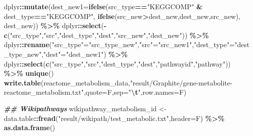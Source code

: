 \documentclass[
]{book}
\newenvironment{Shaded}{\begin{snugshade}}{\end{snugshade}}
\newcommand{\AttributeTok}[1]{\textcolor[rgb]{0.13,0.29,0.53}{#1}}
\newcommand{\DocumentationTok}[1]{\textcolor[rgb]{0.56,0.35,0.01}{\textbf{\textit{#1}}}}
\newcommand{\FunctionTok}[1]{\textcolor[rgb]{0.13,0.29,0.53}{\textbf{#1}}}
\newcommand{\NormalTok}[1]{#1}
\newcommand{\OtherTok}[1]{\textcolor[rgb]{0.56,0.35,0.01}{#1}}
\newcommand{\SpecialCharTok}[1]{\textcolor[rgb]{0.81,0.36,0.00}{\textbf{#1}}}
\newcommand{\StringTok}[1]{\textcolor[rgb]{0.31,0.60,0.02}{#1}}
\begin{document}
\begin{Shaded}
\begin{Highlighting}[]
\NormalTok{  dplyr}\SpecialCharTok{::}\FunctionTok{mutate}\NormalTok{(}\AttributeTok{dest\_new1=}\FunctionTok{ifelse}\NormalTok{(src\_type}\SpecialCharTok{==}\StringTok{"KEGGCOMP"} \SpecialCharTok{\&}\NormalTok{ dest\_type}\SpecialCharTok{==}\StringTok{"KEGGCOMP"}\NormalTok{,}
                                 \FunctionTok{ifelse}\NormalTok{(src\_new}\SpecialCharTok{\textgreater{}}\NormalTok{dest\_new,dest\_new,src\_new),}
\NormalTok{                                 dest\_new)) }\SpecialCharTok{\%\textgreater{}\%}
\NormalTok{  dplyr}\SpecialCharTok{::}\FunctionTok{select}\NormalTok{(}\SpecialCharTok{{-}}\FunctionTok{c}\NormalTok{(}\StringTok{"src\_type"}\NormalTok{,}\StringTok{"src"}\NormalTok{,}\StringTok{"dest\_type"}\NormalTok{,}\StringTok{"dest"}\NormalTok{,}\StringTok{"src\_new"}\NormalTok{,}\StringTok{"dest\_new"}\NormalTok{)) }\SpecialCharTok{\%\textgreater{}\%}
\NormalTok{  dplyr}\SpecialCharTok{::}\FunctionTok{rename}\NormalTok{(}\StringTok{"src\_type"}\OtherTok{=}\StringTok{"src\_type\_new"}\NormalTok{,}\StringTok{"src"}\OtherTok{=}\StringTok{"src\_new1"}\NormalTok{,}\StringTok{"dest\_type"}\OtherTok{=}\StringTok{"dest\_type\_new"}\NormalTok{,}\StringTok{"dest"}\OtherTok{=}\StringTok{"dest\_new1"}\NormalTok{) }\SpecialCharTok{\%\textgreater{}\%}
\NormalTok{  dplyr}\SpecialCharTok{::}\FunctionTok{select}\NormalTok{(}\FunctionTok{c}\NormalTok{(}\StringTok{"src\_type"}\NormalTok{,}\StringTok{"src"}\NormalTok{,}\StringTok{"dest\_type"}\NormalTok{,}\StringTok{"dest"}\NormalTok{,}\StringTok{"pathwayid"}\NormalTok{,}\StringTok{"pathway"}\NormalTok{)) }\SpecialCharTok{\%\textgreater{}\%}
  \FunctionTok{unique}\NormalTok{()}
\FunctionTok{write.table}\NormalTok{(reactome\_metabolism\_data,}\StringTok{"result/Graphite/gene{-}metabolite{-}reactome\_metabolism.txt"}\NormalTok{,}\AttributeTok{quote=}\NormalTok{F,}\AttributeTok{sep=}\StringTok{"}\SpecialCharTok{\textbackslash{}t}\StringTok{"}\NormalTok{,}\AttributeTok{row.names=}\NormalTok{F)}

\DocumentationTok{\#\# Wikipathways}
\NormalTok{wikipathway\_metabolism\_id }\OtherTok{\textless{}{-}}\NormalTok{ data.table}\SpecialCharTok{::}\FunctionTok{fread}\NormalTok{(}\StringTok{"result/wikipath/test\_metabolic.txt"}\NormalTok{,}\AttributeTok{header=}\NormalTok{F) }\SpecialCharTok{\%\textgreater{}\%}
  \FunctionTok{as.data.frame}\NormalTok{()}


\end{Highlighting}
\end{Shaded}
\end{document}
